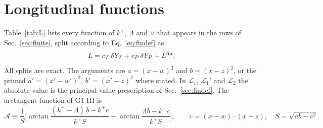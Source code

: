 \documentclass[aps,prd,onecolumn,superscriptaddress,nofootinbib,floatfix,longbibliography,11pt]{revtex4-2}
\numberwithin{equation}{section}
\newcommand{\Lo}{\mathcal{L}_{1}}
\newcommand{\Lop}{\mathcal{L}_{1}'}
\newcommand{\Lt}{\mathcal{L}_{2}}
\begin{document}
\section{Longitudinal functions}\label{app:long}

Table~\ref{tab:L} lists every function of $k^+$, $\Lambda$ and $\vee$ that appears in the rows of Sec.~\ref{sec:finite}, split according to Eq.~\eqref{eq:findef} as
\begin{equation}
L=c_T\,\delta Y_T+c_P\,\delta Y_P+L^{\rm fin}.
\end{equation}
All splits are exact. The arguments are $a=(x-w)^2$ and $b=(x-z)^2$, or the primed $a'=(x'-w')^2$, $b'=(x'-z)^2$ where stated. In $\Lo$, $\Lop$ and $\Lt$ the absolute value is the principal-value prescription of Sec.~\ref{sec:findef}. The arctangent function of G1-III is
\begin{equation}
\mathcal A\equiv\frac1S\Big[\arctan\frac{(k^+-\Lambda)\,b-k^+c}{k^+S}-\arctan\frac{\Lambda b-k^+c}{k^+S}\Big],\qquad c=(x-w)\cdot(x-z),\quad S=\sqrt{ab-c^2}.
\end{equation}
\end{document}
